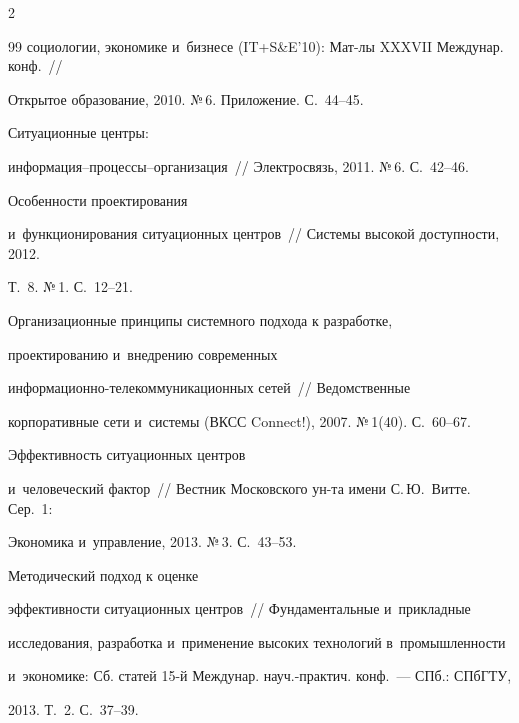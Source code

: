 \begin{multicols}{2}
{{\begin{thebibliography}{99}
социологии, экономике и~бизнесе (IT\;+\;S\&E'10): Мат-лы XXXVII Междунар. конф.~//

Открытое образование, 2010. №\,6. Приложение. С.~44--45.




 Ситуационные центры:

ин\-фор\-ма\-ция--про\-цес\-сы--ор\-га\-ни\-за\-ция~// Электросвязь, 2011. №\,6. С.~42--46.




 Особенности проектирования

и~функционирования ситуационных цент\-ров~// Системы высокой доступности, 2012.

Т.~8. №\,1. С.~12--21.








 Организационные принципы сис\-тем\-но\-го подхода к разработке,

проектированию и~внедрению современных

ин\-фор\-ма\-ци\-он\-но-те\-ле\-ком\-му\-ни\-ка\-ци\-он\-ных сетей~// Ведомственные

корпоративные сети и~системы (ВКСС Connect!), 2007. №\,1(40). С.~60--67.


 Эффективность ситуационных центров

и~человеческий фактор~// Вестник Московского ун-та имени С.\,Ю.~Витте. Сер.~1:

Экономика и~управление, 2013. №\,3. С.~43--53.


 Методиче\-ский подход к оценке

эффективности ситуационных центров~// Фундаментальные и~прикладные

исследования, разработка и~применение высоких технологий в~промышленности

и~экономике: Сб. статей 15-й Междунар. науч.-практич. конф.~--- СПб.: СПбГТУ,

2013. Т.~2. С.~37--39.



\end{thebibliography}}}
\end{multicols}
